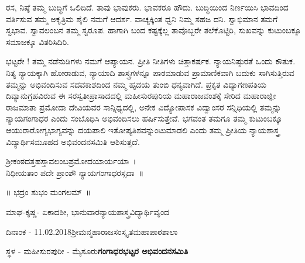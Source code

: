 {ರಸ, ನಿಷ್ಠೆ ತಮ್ಮ ಬುದ್ಧಿಗೆ ಒಲಿದಿದೆ. ತಾವು ಭಾವುಕರು. ಭಾವಕರೂ ಹೌದು. ಬುದ್ಧಿಯಿಂದ ನಿರ್ಣಯಿಸಿ ಭಾವದಿಂದ ವರ್ತಿಸುವ ತಮ್ಮ ಅಕೃತ್ರಿಮ ಶೈಲಿ ನಮಗೆ ಆದರ್ಶ. ವಾಚ್ಯಕ್ಕಿಂತ ಧ್ವನಿ ನಿಮ್ಮ ಸಹಜ ದನಿ.  ಸ್ವಾಭಿಮಾನ ತಮಗೆ ಸ್ವಭಾವ. ಸ್ವಾವಲಂಬನ ತಮ್ಮ ಸ್ವರೂಪ. ಹಾಗಾಗಿ ಬಂದ ಕಷ್ಟಕ್ಕೆಲ್ಲ ತಾವೊಬ್ಬರೇ ತಲೆಕೊಟ್ಟಿರಿ, ಸುಖವನ್ನು ಕುಟುಂಬಕ್ಕೂ ಸಮಾಜಕ್ಕೂ ವಿತರಿಸಿದಿರಿ.

ಭಟ್ಟರೇ ! ತಮ್ಮ ನಡೆನುಡಿಗಳು ನಮಗೆ ಆಪ್ಯಾಯನ. ಪ್ರೀತಿ ನೀತಿಗಳು ಚಿತ್ತಾಕರ್ಷಕ. ನ್ಯಾಯ\-ನಿಷ್ಠುರತೆ ಒಂದು ಕೌತುಕ.  ನಿತ್ಯ ನ್ಯಾಯಕ್ಕಾಗಿ ಹೋರಾಡುವ, ನ್ಯಾಯಾದಿ ಶಾಸ್ತ್ರಗಳನ್ನೂ ಪಾಠ\-ಮಾಡುವ ಪ್ರಾಮಾಣಿಕವಾಗಿ ಬದುಕು ಸಾಗಿಸುತ್ತಿರುವ ತಮ್ಮನ್ನು ಅಭಿವಂದಿಸುವ ಸದವಕಾಶದಿಂದ ನಮ್ಮ ಹೃದಯ ತುಂಬಿ ಧನ್ಯವಾಗಿದೆ. ಪ್ರಕೃತ ವಿದ್ಯಾಗಣಪತಿಯ ದಿವ್ಯಾನುಗ್ರಹವಿರುವ ಈ ಸರಸ್ವತೀಪ್ರಾಸಾದದಲ್ಲಿ ಮಹೀಸುರ\-ಪುರಿಯ ಮಹಾರಾಜವಂಶಕ್ಕೆ ಸೇರಿದ ಮಹಾರಾಜ್ಞೀ ರಾಜಮಾತಾ ಪ್ರಮೋದಾ ದೇವಿಯವರ ಸಾನ್ನಿಧ್ಯದಲ್ಲಿ, ಅನೇಕ ವಿದ್ಯೋಪಾಸಕ ವಿದ್ವಾಂಸರ ಸನ್ನಿಧಿ\-ಯಲ್ಲಿ ತಮ್ಮನ್ನು ನ್ಯಾಯ\-ಗಂಗಾಧರ ಎಂದು ಸಂಬೊಧಿಸಿ ಅಭಿವಂದಿಸಲು ಹರ್ಷಿಸು\-ತ್ತೇವೆ. ಭಗವಂತ ತಮಗೂ ತಮ್ಮ ಕುಟುಂಬಕ್ಕೂ ಆಯುರಾರೋಗ್ಯಭಾಗ್ಯವನ್ನು ದಯಪಾಲಿ ಇತೋಪ್ಯತಿಶವನ್ನುಂಟುಮಾಡಲಿ ಎಂದು ತಮ್ಮ ಪ್ರೀತಿಯ ನ್ಯಾಯಶಾಸ್ತ್ರ ವಿದ್ಯಾರ್ಥಿ\-ಸಮೂಹದ ಅಭಿವಂದನಸಮಿತಿ ಆಶಿಸುತ್ತದೆ.

\begin{center}
ಶ್ರೀಕಂಠದತ್ತಹಸ್ತಾವಲಂಬಪ್ರಮೋದಯಾರ್ಯಯಾ~।\\
ನಿಧೀಯತಾಂ ಪದೇ ಪ್ರಾಂಶೌ ನ್ಯಾಯಗಂಗಾಧರಸ್ಸದಾ~॥
\end{center}

\centerline{॥ ಭದ್ರಂ ಶುಭಂ ಮಂಗಲಮ್~॥}
\bigskip

\noindent
ಮಾಘ-ಕೃಷ್ಣ- ಏಕಾದಶೀ, ಭಾನುವಾರ\hfill				           ನ್ಯಾಯಶಾಸ್ತ್ರವಿದ್ಯಾರ್ಥಿವೃಂದ

\noindent
ದಿನಾಂಕ - 11.02.2018\hfill  						     ಶ್ರೀಮನ್ಮಹಾರಾಜಸಂಸ್ಕೃತಮಹಾಪಾಠಶಾಲಾ

\noindent
ಸ್ಥಳ - ಮಹೀಸುರಪುರೀ - ಮೈಸೂರು\hfill				        \textbf{ಗಂಗಾಧರಭಟ್ಟರ ಅಭಿವಂದನಸಮಿತಿ}
}
